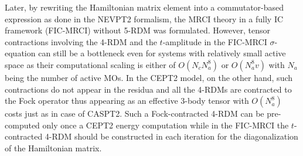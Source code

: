 \documentclass[aip,jcp,amsmath]{revtex4-1}
\begin{document}
%
Later, by rewriting the Hamiltonian matrix element into a commutator-based expression as done in the NEVPT2 formalism,\cite{angeliintroduction2001} the MRCI theory in a fully IC framework (FIC-MRCI) without 5-RDM was formulated.\cite{saitowmultireference2013,doi:10.1021/acs.jctc.5b00270,doi:10.1063/1.4907717,doi:10.1063/1.4959029}
%
However, tensor contractions involving the 4-RDM and the $t$-amplitude in the FIC-MRCI $\sigma$-equation can still be a bottleneck even for systems with relatively small active space as their computational scaling is either of $O(N_c N_a^8)$ or $O(N_a^8v)$ with $N_a$ being the number of active MOs.
%
In the CEPT2 model, on the other hand, such contractions do not appear in the residua and all the 4-RDMs are contracted to the Fock operator thus appearing as an effective 3-body tensor with $O(N_a^8)$ costs just as in case of CASPT2.
%
Such a Fock-contracted 4-RDM can be pre-computed only once a CEPT2 energy computation while in the FIC-MRCI the $t$-contracted 4-RDM should be constructed in each iteration for the diagonalization of the Hamiltonian matrix.

\end{document}
